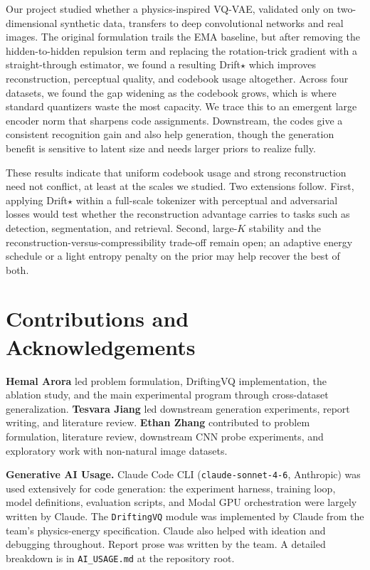 \documentclass[10pt,twocolumn,letterpaper]{article}
\begin{document}
Our project studied whether a physics-inspired VQ-VAE, validated only on
two-dimensional synthetic data, transfers to deep convolutional networks and real
images. The original formulation trails the EMA baseline, but after removing the hidden-to-hidden repulsion term
and replacing the rotation-trick gradient with a straight-through estimator, we found a
resulting Drift$\star$ which improves reconstruction, perceptual quality, and codebook usage
altogether. Across four datasets, we found the gap widening as the codebook grows, which is
where standard quantizers waste the most capacity. We trace this to an emergent large
encoder norm that sharpens code assignments. Downstream, the codes give a consistent
recognition gain and also help generation, though the generation benefit is sensitive
to latent size and needs larger priors to realize fully.

These results indicate that uniform codebook usage and strong reconstruction need not
conflict, at least at the scales we studied. Two extensions follow. First, applying
Drift$\star$ within a full-scale tokenizer with perceptual and adversarial losses would
test whether the reconstruction advantage carries to tasks such as detection,
segmentation, and retrieval. Second, large-$K$ stability and the
reconstruction-versus-compressibility trade-off remain open; an adaptive energy schedule
or a light entropy penalty on the prior may help recover the best of both.

{\small


}

\section*{Contributions and Acknowledgements}

\noindent\textbf{Hemal Arora} led problem formulation, DriftingVQ implementation, the ablation study, and the main experimental program through cross-dataset generalization.
\textbf{Tesvara Jiang} led downstream generation experiments, report writing, and literature review.
\textbf{Ethan Zhang} contributed to problem formulation, literature review, downstream CNN probe experiments, and exploratory work with non-natural image datasets.

\medskip
\noindent\textbf{Generative AI Usage.}
Claude Code CLI (\texttt{claude-sonnet-4-6}, Anthropic) was used extensively for code generation: the experiment harness, training loop, model definitions, evaluation scripts, and Modal GPU orchestration were largely written by Claude. The \texttt{DriftingVQ} module was implemented by Claude from the team's physics-energy specification. Claude also helped with ideation and debugging throughout. Report prose was written by the team. A detailed breakdown is in \texttt{AI\_USAGE.md} at the repository root.
\end{document}
